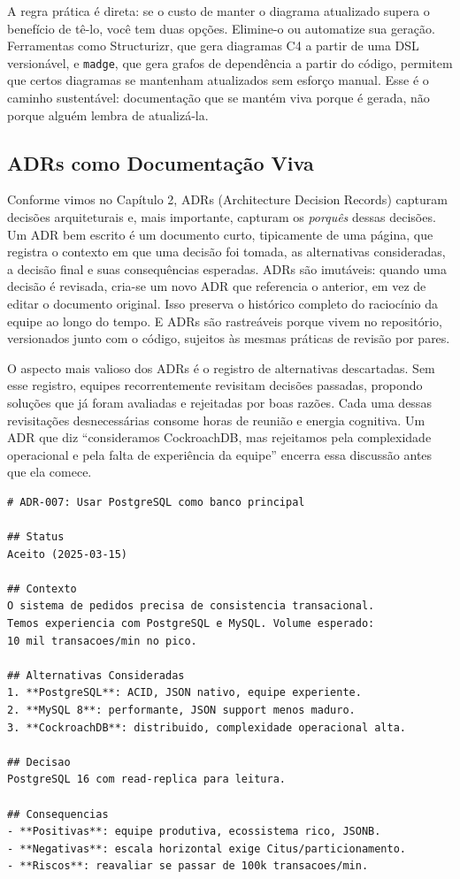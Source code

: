 A regra prática é direta: se o custo de manter o diagrama atualizado
supera o benefício de tê-lo, você tem duas opções. Elimine-o ou
automatize sua geração. Ferramentas como Structurizr, que gera diagramas
C4 a partir de uma DSL versionável, e \texttt{madge}, que gera grafos
de dependência a partir do código, permitem que certos diagramas se
mantenham atualizados sem esforço manual. Esse é o caminho sustentável:
documentação que se mantém viva porque é gerada, não porque alguém
lembra de atualizá-la.


\subsection{ADRs como Documentação Viva}

Conforme vimos no Capítulo 2, ADRs (Architecture Decision Records)
capturam decisões arquiteturais e, mais importante, capturam os
\textit{porquês} dessas decisões. Um ADR bem escrito é um documento
curto, tipicamente de uma página, que registra o contexto em que uma
decisão foi tomada, as alternativas consideradas, a decisão final e suas
consequências esperadas. ADRs são imutáveis: quando uma decisão é
revisada, cria-se um novo ADR que referencia o anterior, em vez de
editar o documento original. Isso preserva o histórico completo do
raciocínio da equipe ao longo do tempo. E ADRs são rastreáveis porque
vivem no repositório, versionados junto com o código, sujeitos às mesmas
práticas de revisão por pares.

O aspecto mais valioso dos ADRs é o registro de alternativas descartadas.
Sem esse registro, equipes recorrentemente revisitam decisões passadas,
propondo soluções que já foram avaliadas e rejeitadas por boas razões.
Cada uma dessas revisitações desnecessárias consome horas de reunião e
energia cognitiva. Um ADR que diz ``consideramos CockroachDB, mas
rejeitamos pela complexidade operacional e pela falta de experiência da
equipe'' encerra essa discussão antes que ela comece.

\begin{lstlisting}[language={}, caption={Template de ADR com Exemplo Preenchido}]
# ADR-007: Usar PostgreSQL como banco principal

## Status
Aceito (2025-03-15)

## Contexto
O sistema de pedidos precisa de consistencia transacional.
Temos experiencia com PostgreSQL e MySQL. Volume esperado:
10 mil transacoes/min no pico.

## Alternativas Consideradas
1. **PostgreSQL**: ACID, JSON nativo, equipe experiente.
2. **MySQL 8**: performante, JSON support menos maduro.
3. **CockroachDB**: distribuido, complexidade operacional alta.

## Decisao
PostgreSQL 16 com read-replica para leitura.

## Consequencias
- **Positivas**: equipe produtiva, ecossistema rico, JSONB.
- **Negativas**: escala horizontal exige Citus/particionamento.
- **Riscos**: reavaliar se passar de 100k transacoes/min.
\end{lstlisting}


